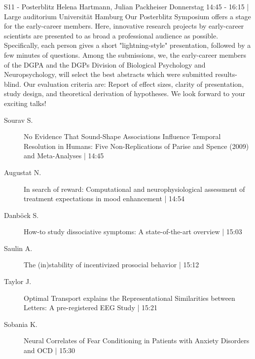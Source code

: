 
            \begin{symposium}
            {S11 - Posterblitz}
            {Helena Hartmann, Julian Packheiser}
            {Donnerstag 14:45 - 16:15 | Large auditorium}
            {Universität Hamburg}
            Our Posterblitz Symposium offers a stage for the early-career members. Here, innovative research projects by early-career scientists are presented to as broad a professional audience as possible. Specifically, each person gives a short "lightning-style" presentation, followed by a few minutes of questions. Among the submissions, we, the early-career members of the DGPA and the DGPs Division of Biological Psychology and Neuropsychology, will select the best abstracts which were submitted results-blind. Our evaluation criteria are: Report of effect sizes, clarity of presentation, study design, and theoretical derivation of hypotheses. We look forward to your exciting talks! 
            \begin{description}    
            
                \item [ Sourav S.] No Evidence That Sound-Shape Associations Influence Temporal Resolution in Humans: Five Non-Replications of Parise and Spence (2009) and Meta-Analyses \textcolor{mygray}{ | 14:45}    
                
                \item [ Augustat N.] In search of reward: Computational and neurophysiological assessment of treatment expectations in mood enhancement \textcolor{mygray}{ | 14:54}    
                
                \item [ Danböck S.] How-to study dissociative symptoms: A state-of-the-art overview \textcolor{mygray}{ | 15:03}    
                
                \item [ Saulin A.] The (in)stability of incentivized prosocial behavior \textcolor{mygray}{ | 15:12}    
                
                \item [ Taylor J.] Optimal Transport explains the Representational Similarities between Letters: A pre-registered EEG Study \textcolor{mygray}{ | 15:21}    
                
                \item [ Sobania K.] Neural Correlates of Fear Conditioning in Patients with Anxiety Disorders and OCD \textcolor{mygray}{ | 15:30}    
                

\end{description}
\end{symposium}
